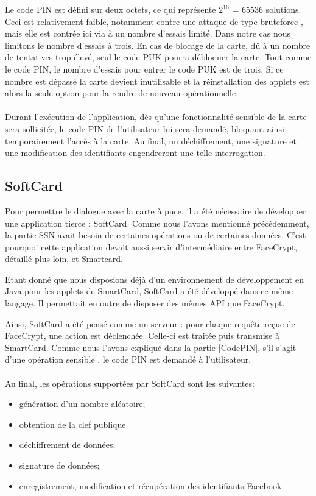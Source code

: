 \documentclass[a4paper,11pt,french]{article}
\begin{document}
Le code PIN est défini sur deux octets, ce qui représente $2^{16}$ = 65536 solutions.
Ceci est relativement faible, notamment contre une attaque de type 
\og{}bruteforce \fg{}, mais elle est contrée ici via à un nombre d'essais limité.
Dans notre cas nous limitons le nombre d'essais à trois. En cas de blocage de la
carte, dû à un nombre de tentatives trop élevé, seul le code PUK pourra 
débloquer la carte. Tout comme le code PIN, le nombre d'essais pour entrer le 
code PUK est de trois. Si ce nombre est dépassé la carte devient inutilisable et
la réinstallation des applets est alors la seule option pour la rendre
de nouveau opérationnelle.

\paragraph{}
Durant l'exécution de l'application, dès qu'une fonctionnalité sensible de la 
carte sera sollicitée, le code PIN de l'utilisateur lui sera demandé, bloquant 
ainsi temporairement l'accès à la carte. Au final, un déchiffrement, une signature
et une modification des identifiants engendreront une telle interrogation.

\subsection{SoftCard}
Pour permettre le dialogue avec la carte à puce, il a été nécessaire de développer
une application tierce : SoftCard. Comme nous l'avons mentionné précédemment,
la partie SSN avait besoin de certaines opérations ou de certaines données. 
C'est pourquoi cette application devait aussi servir d'intermédiaire entre 
FaceCrypt, détaillé plus loin, et Smartcard.

Etant donné que nous disposions déjà d'un environnement de développement en Java
pour les applets de SmartCard, SoftCard a été développé dans ce même langage. Il
permettait en outre de disposer des mêmes API que FaceCrypt.

Ainsi, SoftCard a été pensé comme un serveur : pour chaque requête reçue de 
FaceCrypt, une action est déclenchée. Celle-ci est traitée puis transmise à
SmartCard. Comme nous l'avons expliqué dans la partie \ref{CodePIN}, s'il s'agit
d'une opération \og sensible \fg, le code PIN est demandé à l'utilisateur.

\paragraph{}
Au final, les opérations supportées par SoftCard sont les suivantes:  
\begin{itemize}
    \item génération d'un nombre aléatoire;
    \item obtention de la clef publique
    \item déchiffrement de données;
    \item signature de données;
    \item enregistrement, modification et récupération des identifiants Facebook.
\end{itemize}
\end{document}
